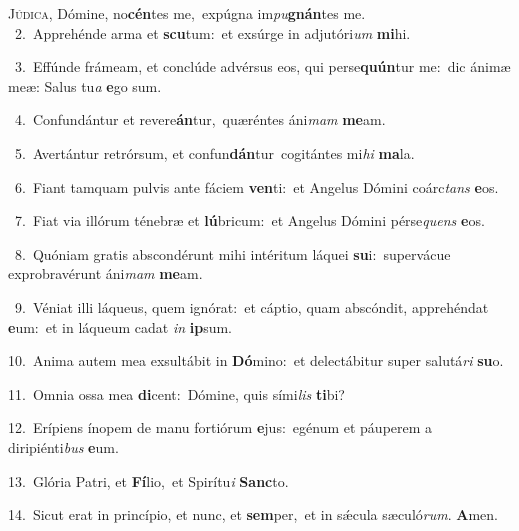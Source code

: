 \lettrine{\initial\textcolor{\initialcolor}{J}}{údica,} Dómine, no\-\textbf{cén}\-tes me,~\star expúgna im\-\textit{pu}\-\textbf{gnán}tes me.\\
{\numbfont\textcolor{\numbcolor}{~2.}}~Apprehénde arma et \textbf{scu}\-tum:~\star et exsúrge in adjutóri\textit{um} \textbf{mi}\-hi.\par
{\numbfont\textcolor{\numbcolor}{~3.}}~Effúnde frámeam, et conclúde advérsus eos, qui perse\-\textbf{quún}\-tur me:~\star dic ánimæ meæ: Salus tu\textit{a} \textbf{e}\-go sum.\par
{\numbfont\textcolor{\numbcolor}{~4.}}~Confundántur et revere\-\textbf{án}\-tur,~\star quæréntes áni\textit{mam} \textbf{me}\-am.\par
{\numbfont\textcolor{\numbcolor}{~5.}}~Avertántur retrórsum, et confun\-\textbf{dán}\-tur~\star cogitántes mi\textit{hi} \textbf{ma}\-la.\par
{\numbfont\textcolor{\numbcolor}{~6.}}~Fiant tamquam pulvis ante fáciem \textbf{ven}\-ti:~\star et Angelus Dómini coárc\textit{tans} \textbf{e}\-os.\par
{\numbfont\textcolor{\numbcolor}{~7.}}~Fiat via illórum ténebræ et \textbf{lú}\-bricum:~\star et Angelus Dómini pérse\textit{quens} \textbf{e}\-os.\par
{\numbfont\textcolor{\numbcolor}{~8.}}~Quóniam gratis abscondérunt mihi intéritum láquei \textbf{su}\-i:~\star supervácue exprobravérunt áni\textit{mam} \textbf{me}\-am.\par
{\numbfont\textcolor{\numbcolor}{~9.}}~Véniat illi láqueus, quem ignórat:~\dagger et cáptio, quam abscóndit, apprehéndat \textbf{e}\-um:~\star et in láqueum cadat \textit{in} \textbf{ip}\-sum.\par
{\numbfont\textcolor{\numbcolor}{10.}}~Anima autem mea exsultábit in \textbf{Dó}\-mino:~\star et delectábitur super salutá\textit{ri} \textbf{su}\-o.\par
{\numbfont\textcolor{\numbcolor}{11.}}~Omnia ossa mea \textbf{di}\-cent:~\star Dómine, quis sími\textit{lis} \textbf{ti}\-bi?\par
{\numbfont\textcolor{\numbcolor}{12.}}~Erípiens ínopem de manu fortiórum \textbf{e}\-jus:~\star egénum et páuperem a diripiénti\textit{bus} \textbf{e}\-um.\par
{\numbfont\textcolor{\numbcolor}{13.}}~Glória Patri, et \textbf{Fí}\-lio,~\star et Spirítu\textit{i} \textbf{Sanc}\-to.\par
{\numbfont\textcolor{\numbcolor}{14.}}~Sicut erat in princípio, et nunc, et \textbf{sem}\-per,~\star et in sǽcula sæculó\-\textit{rum}\-. \textbf{A}\-men.\par

